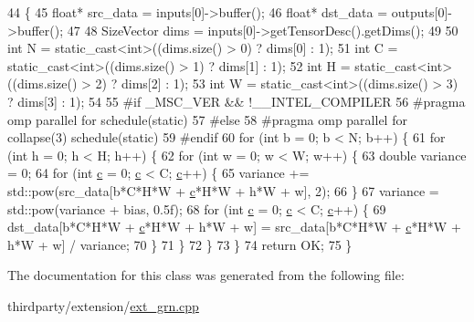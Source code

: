 \begin{DoxyCode}
44                                                              \{
45         \textcolor{keywordtype}{float}* src\_data = inputs[0]->buffer();
46         \textcolor{keywordtype}{float}* dst\_data = outputs[0]->buffer();
47 
48         SizeVector dims = inputs[0]->getTensorDesc().getDims();
49 
50         \textcolor{keywordtype}{int} N = \textcolor{keyword}{static\_cast<}\textcolor{keywordtype}{int}\textcolor{keyword}{>}((dims.size() > 0) ? dims[0] : 1);
51         \textcolor{keywordtype}{int} C = \textcolor{keyword}{static\_cast<}\textcolor{keywordtype}{int}\textcolor{keyword}{>}((dims.size() > 1) ? dims[1] : 1);
52         \textcolor{keywordtype}{int} H = \textcolor{keyword}{static\_cast<}\textcolor{keywordtype}{int}\textcolor{keyword}{>}((dims.size() > 2) ? dims[2] : 1);
53         \textcolor{keywordtype}{int} W = \textcolor{keyword}{static\_cast<}\textcolor{keywordtype}{int}\textcolor{keyword}{>}((dims.size() > 3) ? dims[3] : 1);
54 
55 \textcolor{preprocessor}{#if \_MSC\_VER && !\_\_INTEL\_COMPILER}
56 \textcolor{preprocessor}{        #pragma omp parallel for schedule(static)}
57 \textcolor{preprocessor}{#else}
58 \textcolor{preprocessor}{        #pragma omp parallel for collapse(3) schedule(static)}
59 \textcolor{preprocessor}{#endif}
60         \textcolor{keywordflow}{for} (\textcolor{keywordtype}{int} b = 0; b < N; b++) \{
61             \textcolor{keywordflow}{for} (\textcolor{keywordtype}{int} h = 0; h < H; h++) \{
62                 \textcolor{keywordflow}{for} (\textcolor{keywordtype}{int} w = 0; w < W; w++) \{
63                     \textcolor{keywordtype}{double} variance = 0;
64                     \textcolor{keywordflow}{for} (\textcolor{keywordtype}{int} \hyperlink{CMakeCache_8txt_aac1d6a1710812201527c735f7c6afbaa}{c} = 0; \hyperlink{CMakeCache_8txt_aac1d6a1710812201527c735f7c6afbaa}{c} < C; \hyperlink{CMakeCache_8txt_aac1d6a1710812201527c735f7c6afbaa}{c}++) \{
65                         variance += std::pow(src\_data[b*C*H*W + \hyperlink{CMakeCache_8txt_aac1d6a1710812201527c735f7c6afbaa}{c}*H*W + h*W + w], 2);
66                     \}
67                     variance = std::pow(variance + bias, 0.5f);
68                     \textcolor{keywordflow}{for} (\textcolor{keywordtype}{int} \hyperlink{CMakeCache_8txt_aac1d6a1710812201527c735f7c6afbaa}{c} = 0; \hyperlink{CMakeCache_8txt_aac1d6a1710812201527c735f7c6afbaa}{c} < C; \hyperlink{CMakeCache_8txt_aac1d6a1710812201527c735f7c6afbaa}{c}++) \{
69                         dst\_data[b*C*H*W + \hyperlink{CMakeCache_8txt_aac1d6a1710812201527c735f7c6afbaa}{c}*H*W + h*W + w] = src\_data[b*C*H*W + 
      \hyperlink{CMakeCache_8txt_aac1d6a1710812201527c735f7c6afbaa}{c}*H*W + h*W + w] / variance;
70                     \}
71                 \}
72             \}
73         \}
74         \textcolor{keywordflow}{return} OK;
75     \}
\end{DoxyCode}


The documentation for this class was generated from the following file\+:\begin{DoxyCompactItemize}
\item 
thirdparty/extension/\hyperlink{ext__grn_8cpp}{ext\+\_\+grn.\+cpp}\end{DoxyCompactItemize}
